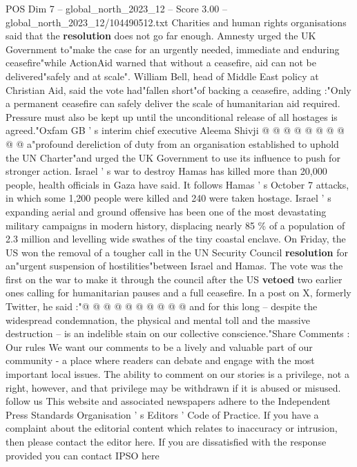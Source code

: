 \begin{textsample}{POS Dim 7 – global\_north\_2023\_12 – Score 3.00 – global\_north\_2023\_12/104490512.txt}
Charities and human rights organisations said that the \textbf{resolution} does not go far enough.
Amnesty urged the UK Government to"make the case for an urgently needed, immediate and enduring ceasefire"while ActionAid warned that without a ceasefire, aid can not be delivered"safely and at scale".
William Bell, head of Middle East policy at Christian Aid, said the vote had"fallen short"of backing a ceasefire, adding :"Only a permanent ceasefire can safely deliver the scale of humanitarian aid required.
Pressure must also be kept up until the unconditional release of all hostages is agreed."Oxfam GB ' s interim chief executive Aleema Shivji @ @ @ @ @ @ @ @ @ @ a"profound dereliction of duty from an organisation established to uphold the UN Charter"and urged the UK Government to use its influence to push for stronger action.
Israel ' s war to destroy Hamas has killed more than 20,000 people, health officials in Gaza have said.
It follows Hamas ' s October 7 attacks, in which some 1,200 people were killed and 240 were taken hostage.
Israel ' s expanding aerial and ground offensive has been one of the most devastating military campaigns in modern history, displacing nearly 85 \% of a population of 2.3 million and levelling wide swathes of the tiny coastal enclave.
On Friday, the US won the removal of a tougher call in the UN Security Council \textbf{resolution} for an"urgent suspension of hostilities"between Israel and Hamas.
The vote was the first on the war to make it through the council after the US \textbf{vetoed} two earlier ones calling for humanitarian pauses and a full ceasefire.
In a post on X, formerly Twitter, he said :"@ @ @ @ @ @ @ @ @ @ and for this long -- despite the widespread condemnation, the physical and mental toll and the massive destruction -- is an indelible stain on our collective conscience."Share Comments : Our rules We want our comments to be a lively and valuable part of our community - a place where readers can debate and engage with the most important local issues.
The ability to comment on our stories is a privilege, not a right, however, and that privilege may be withdrawn if it is abused or misused. follow us This website and associated newspapers adhere to the Independent Press Standards Organisation ' s Editors ' Code of Practice.
If you have a complaint about the editorial content which relates to inaccuracy or intrusion, then please contact the editor here.
If you are dissatisfied with the response provided you can contact IPSO here

\end{textsample}
